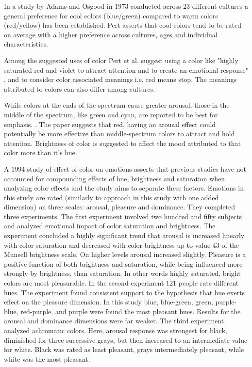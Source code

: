 		In a study by Adams and Osgood in 1973 conducted across 23 different cultures a general preference for cool colors (blue/green) compared to warm colors (red/yellow) has been established. Pert asserts that cool colors tend to be rated on average with a higher preference across cultures, ages and individual characteristics.
		
		Among the suggested uses of color Pert et al. suggest using a color like "highly saturated red and violet to attract attention and to create an emotional response" \cite{Pett1996}, and to consider color associated meanings i.e. red means stop. The meanings attributed to colors can also differ among cultures.
		
		
		While colors at the ends of the spectrum cause greater arousal, those in the middle of the spectrum, like green and cyan, are reported to be best for emphasis. \cite{Pett1996}. The paper suggests that red, having an arousal effect could potentially be more effective than middle-spectrum colors to attract and hold attention. Brightness of color is suggested to affect the mood attributed to that color more than it's hue.

		A 1994 study \cite{Valdez1994} of effect of color on emotions asserts that previous studies have not accounted for compounding effects of hue, brightness and saturation when analyzing color effects and the study aims to separate these factors. Emotions in this study are rated (similarly to approach in this study with one added dimension) on three scales: arousal, pleasure and dominance. They completed three experiments.
		The first experiment involved two hundred and fifty subjects and analyzed emotional impact of color saturation and brightness. The experiment concluded a highly significant trend that arousal is increased linearly with color saturation and decreased with color brightness up to value 43 of the Munsell brightness scale. On higher levels arousal increased slightly. Pleasure is a positive function of both brightness and saturation, while being influenced more strongly by brightness, than saturation. In other words highly saturated, bright colors are most pleasurable.
		In the second experiment 121 people rate different hues. The experiment found consistent support to the hypothesis that hue exerts effect on the pleasure dimension. In this study blue, blue-green, green, purple-blue, red-purple, and purple	were found the most pleasant hues. Results for the arousal and dominance dimensions were far weaker.
		The third experiment analyzed achromatic colors. Here, arousal response was strongest for black, diminished for three successive grays, but then increased to an intermediate value for white. Black was rated as least pleasant, grays intermediately pleasant, while white was the most pleasant. \cite{Valdez1994} 
		
